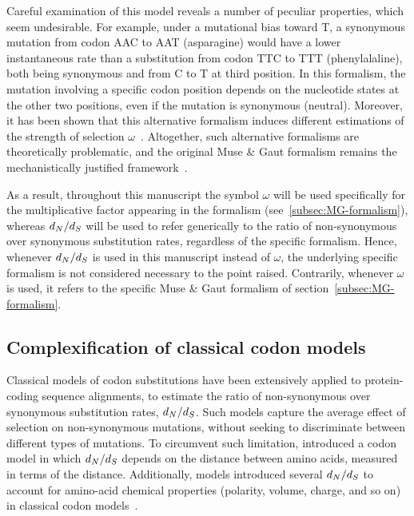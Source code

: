 Careful examination of this model reveals a number of peculiar properties, which seem undesirable.
For example, under a mutational bias toward T, a synonymous mutation from codon AAC to AAT (asparagine) would have a lower instantaneous rate than a substitution from codon TTC to TTT (phenylalaline), both being synonymous and from C to T at third position.
In this formalism, the mutation involving a specific codon position depends on the nucleotide states at the other two positions, even if the mutation is synonymous (neutral).
Moreover, it has been shown that this alternative formalism induces different estimations of the strength of selection $\omega$~\citep{Pond2005a,Yap2010, Spielman2015}.
Altogether, such alternative formalisms are theoretically problematic, and the original Muse \& Gaut formalism remains the mechanistically justified framework~\citep{Rodrigue2008a}.

As a result, throughout this manuscript the symbol $\omega$ will be used specifically for the multiplicative factor appearing in the \citet{Muse1994} formalism (see~\ref{subsec:MG-formalism}), whereas $d_N / d_S$ will be used to refer generically to the ratio of non-synonymous over synonymous substitution rates, regardless of the specific formalism.
Hence, whenever $d_N / d_S$ is used in this manuscript instead of $\omega$, the underlying specific formalism is not considered necessary to the point raised.
Contrarily, whenever $\omega$ is used, it refers to the specific Muse \& Gaut formalism of section~\ref{subsec:MG-formalism}.

\subsection{Complexification of classical codon models}
\label{subsec:classical-codon-models-complexification}

Classical models of codon substitutions have been extensively applied to protein-coding sequence alignments, to estimate the ratio of non-synonymous over synonymous substitution rates, $d_N / d_S$.
Such models capture the average effect of selection on non-synonymous mutations, without seeking to discriminate between different types of mutations.
To circumvent such limitation, \citet{Yang1998a} introduced a codon model in which $d_N / d_S$ depends on the distance between amino acids, measured in terms of the \citet{Grantham1974} distance.
Additionally, models introduced several $d_N / d_S$ to account for amino-acid chemical properties (polarity, volume, charge, and so on) in classical codon models~\citep{Dutheil2008}.

